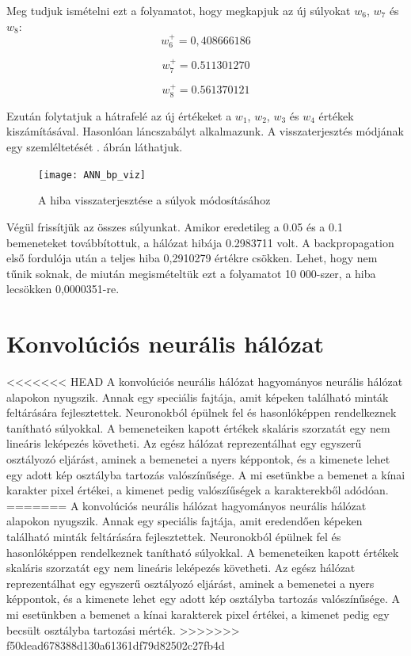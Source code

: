 Meg tudjuk ismételni ezt a folyamatot, hogy megkapjuk az új súlyokat $w_6$, $w_7$ és $w_8$:
$$
w_6 ^ {+} = 0,408666186
$$

$$
w_7 ^ {+} = 0.511301270
$$

$$
w_8 ^ {+} = 0.561370121
$$

Ezután folytatjuk a hátrafelé az új értékeket a $w_1$, $w_2$, $w_3$ és $w_4$ értékek kiszámításával. Hasonlóan láncszabályt alkalmazunk. A visszaterjesztés módjának egy szemléltetését . ábrán láthatjuk.

\begin{figure}
\centering
\texttt{[image: ANN\_bp\_viz]}
\caption{A hiba visszaterjesztése a súlyok módosításához}
\label{fig:ANN_bp_viz}
\end{figure}

Végül frissítjük az összes súlyunkat. Amikor eredetileg a 0.05 és a 0.1 bemeneteket továbbítottuk, a hálózat hibája 0.2983711 volt. A backpropagation első fordulója után a teljes hiba 0,2910279 értékre csökken. Lehet, hogy nem tűnik soknak, de miután megismételtük ezt a folyamatot 10 000-szer, a hiba lecsökken 0,0000351-re.

\section{Konvolúciós neurális hálózat}

<<<<<<< HEAD
A konvolúciós neurális hálózat\cite{liconvolution}\cite{lecun1995convolutional} hagyományos neurális hálózat alapokon nyugszik. Annak egy speciális fajtája, amit képeken található minták feltárására fejlesztettek. Neuronokból épülnek fel és hasonlóképpen rendelkeznek tanítható súlyokkal. A bemeneteiken kapott értékek skaláris szorzatát egy nem lineáris leképezés követheti. Az egész hálózat reprezentálhat egy egyszerű osztályozó eljárást, aminek a bemenetei a nyers képpontok, és a kimenete lehet egy adott kép osztályba tartozás valószínűsége. A mi esetünkbe a bemenet a kínai karakter pixel értékei, a kimenet pedig valószíűségek a karakterekből adódóan.
=======
A konvolúciós neurális hálózat hagyományos neurális hálózat alapokon nyugszik. Annak egy speciális fajtája, amit eredendően képeken található minták feltárására fejlesztettek. Neuronokból épülnek fel és hasonlóképpen rendelkeznek tanítható súlyokkal. A bemeneteiken kapott értékek skaláris szorzatát egy nem lineáris leképezés követheti. Az egész hálózat reprezentálhat egy egyszerű osztályozó eljárást, aminek a bemenetei a nyers képpontok, és a kimenete lehet egy adott kép osztályba tartozás valószínűsége. A mi esetünkben a bemenet a kínai karakterek pixel értékei, a kimenet pedig egy becsült osztályba tartozási mérték.
>>>>>>> f50dead678388d130a61361df79d82502c27fb4d

